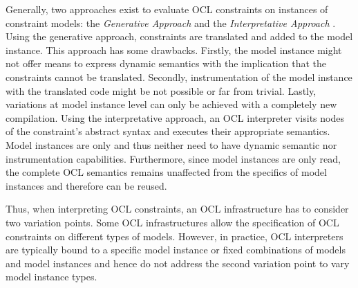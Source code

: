 	Generally, two approaches exist to evaluate OCL constraints on instances of constraint
	models: the \textit{Generative Approach} and the \textit{Interpretative Approach}
	\cite{demuthRGWS09}.	
	Using the generative approach, constraints are 
	translated  and added to the model instance. 
	This approach has some drawbacks. 
	Firstly, the model instance might not offer means to express dynamic semantics with 
	the implication that the constraints cannot be translated. Secondly, 
  instrumentation of the model instance with the translated code might be not possible 
	or far from trivial. Lastly, variations at model instance level can only be achieved with 
	a completely new compilation. Using the interpretative approach, 
	an OCL interpreter visits nodes of the constraint's abstract syntax and 
	executes their appropriate semantics. Model instances are only 
	 and thus neither 
	need to have dynamic semantic nor instrumentation capabilities. Furthermore, 
	since model instances are only read, the complete OCL semantics remains 
	unaffected from the specifics of model instances and therefore can be reused.
	

	
	Thus, when interpreting OCL constraints, an OCL infrastructure has to consider two 
	variation points. Some OCL infrastructures allow the specification of OCL constraints 
	on different types of models. However, in practice, OCL interpreters are typically bound 
	to a specific  model instance or  fixed combinations of models and model instances 
	 and hence do not address the second variation point to vary model instance types.
	
